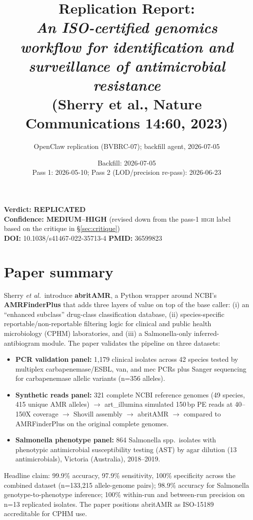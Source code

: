 \documentclass[11pt,a4paper]{article}
\title{Replication Report: \\ \emph{An ISO-certified genomics workflow for identification and surveillance of antimicrobial resistance} \\ (Sherry et al., Nature Communications 14:60, 2023)}
\author{OpenClaw replication (BVBRC-07); backfill agent, 2026-07-05}
\date{Backfill: 2026-07-05 \\ Pass 1: 2026-05-10; Pass 2 (LOD/precision re-pass): 2026-06-23}
\begin{document}
\maketitle

\begin{center}
\textbf{Verdict: REPLICATED} \\
\textbf{Confidence: MEDIUM--HIGH} (revised down from the pass-1 \textsc{high} label based on the critique in \S\ref{sec:critique}) \\
\textbf{DOI:} 10.1038/s41467-022-35713-4 \quad \textbf{PMID:} 36599823
\end{center}

\tableofcontents

\section{Paper summary}

Sherry \emph{et al.}~introduce \textbf{abritAMR}, a Python wrapper around NCBI's \textbf{AMRFinderPlus} that adds three layers of value on top of the base caller: (i) an ``enhanced subclass'' drug-class classification database, (ii) species-specific reportable/non-reportable filtering logic for clinical and public health microbiology (CPHM) laboratories, and (iii) a Salmonella-only inferred-antibiogram module. The paper validates the pipeline on three datasets:

\begin{itemize}[leftmargin=1.5em]
  \item \textbf{PCR validation panel:} 1{,}179 clinical isolates across 42 species tested by multiplex carbapenemase/ESBL, van, and mec PCRs plus Sanger sequencing for carbapenemase allelic variants (n=356 alleles).
  \item \textbf{Synthetic reads panel:} 321 complete NCBI reference genomes (49 species, 415 unique AMR alleles) $\to$ art\_illumina simulated 150\,bp PE reads at 40--150X coverage $\to$ Shovill assembly $\to$ abritAMR $\to$ compared to AMRFinderPlus on the original complete genomes.
  \item \textbf{Salmonella phenotype panel:} 864 Salmonella spp.~isolates with phenotypic antimicrobial susceptibility testing (AST) by agar dilution (13 antimicrobials), Victoria (Australia), 2018--2019.
\end{itemize}

Headline claim: 99.9\% accuracy, 97.9\% sensitivity, 100\% specificity across the combined dataset (n=133{,}215 allele-genome pairs); 98.9\% accuracy for Salmonella genotype-to-phenotype inference; 100\% within-run and between-run precision on n=13 replicated isolates. The paper positions abritAMR as ISO-15189 accreditable for CPHM use.
\end{document}
